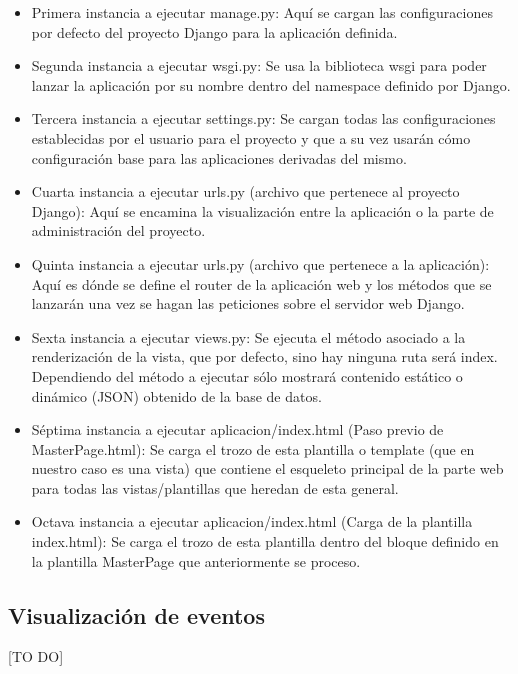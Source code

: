 \begin{itemize}
\item Primera instancia a ejecutar manage.py: Aquí se cargan las configuraciones por defecto del proyecto Django para la aplicación definida.
\item Segunda instancia a ejecutar wsgi.py: Se usa la biblioteca wsgi para poder lanzar la aplicación por su nombre dentro del namespace definido por Django.
\item Tercera instancia a ejecutar settings.py: Se cargan todas las configuraciones establecidas por el usuario para el proyecto y que a su vez usarán cómo configuración base para las aplicaciones derivadas del mismo.
\item Cuarta instancia a ejecutar urls.py (archivo que pertenece al proyecto Django): Aquí se encamina la visualización entre la aplicación o la parte de administración del proyecto.
\item Quinta instancia a ejecutar urls.py (archivo que pertenece a la aplicación): Aquí es dónde se define el router de la aplicación web y los métodos que se lanzarán una vez se hagan las peticiones sobre el servidor web Django.
\item Sexta instancia a ejecutar views.py: Se ejecuta el método asociado a la renderización de la vista, que por defecto, sino hay ninguna ruta será index. Dependiendo del método a ejecutar sólo mostrará contenido estático o dinámico (JSON) obtenido de la base de datos.
\item Séptima instancia a ejecutar aplicacion/index.html (Paso previo de MasterPage.html): Se carga el trozo de esta plantilla o template (que en nuestro caso es una vista) que contiene el esqueleto principal de la parte web para todas las vistas/plantillas que heredan de esta general.
\item Octava instancia a ejecutar aplicacion/index.html (Carga de la plantilla index.html): Se carga el trozo de esta plantilla dentro del bloque definido en la plantilla MasterPage que anteriormente se proceso.
\end{itemize}


\subsection{Visualización de eventos}
[TO DO]
